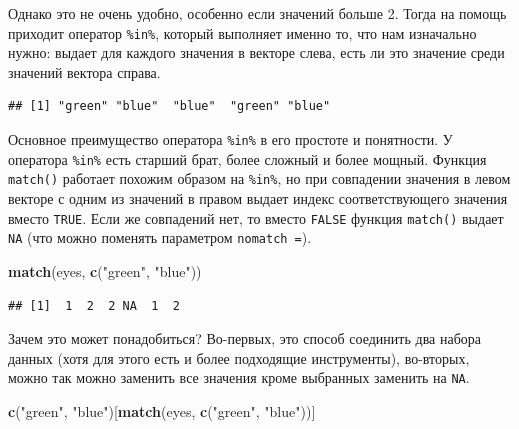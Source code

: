 \documentclass[]{book}
\newenvironment{Shaded}{\begin{snugshade}}{\end{snugshade}}
\newcommand{\KeywordTok}[1]{\textcolor[rgb]{0.13,0.29,0.53}{\textbf{#1}}}
\newcommand{\StringTok}[1]{\textcolor[rgb]{0.31,0.60,0.02}{#1}}
\newcommand{\OperatorTok}[1]{\textcolor[rgb]{0.81,0.36,0.00}{\textbf{#1}}}
\newcommand{\NormalTok}[1]{#1}
\begin{document}
Однако это не очень удобно, особенно если значений больше 2. Тогда на
помощь приходит оператор \texttt{\%in\%}, который выполняет именно то,
что нам изначально нужно: выдает для каждого значения в векторе слева,
есть ли это значение среди значений вектора справа.

\begin{Shaded}
\end{Shaded}

\begin{verbatim}
## [1] "green" "blue"  "blue"  "green" "blue"
\end{verbatim}

Основное преимущество оператора \texttt{\%in\%} в его простоте и
понятности. У оператора \texttt{\%in\%} есть старший брат, более сложный
и более мощный. Функция \texttt{match()} работает похожим образом на
\texttt{\%in\%}, но при совпадении значения в левом векторе с одним из
значений в правом выдает индекс соответствующего значения вместо
\texttt{TRUE}. Если же совпадений нет, то вместо \texttt{FALSE} функция
\texttt{match()} выдает \texttt{NA} (что можно поменять параметром
\texttt{nomatch\ =}).

\begin{Shaded}
\begin{Highlighting}[]
\KeywordTok{match}\NormalTok{(eyes, }\KeywordTok{c}\NormalTok{(}\StringTok{"green"}\NormalTok{, }\StringTok{"blue"}\NormalTok{))}
\end{Highlighting}
\end{Shaded}

\begin{verbatim}
## [1]  1  2  2 NA  1  2
\end{verbatim}

Зачем это может понадобиться? Во-первых, это способ соединить два набора
данных (хотя для этого есть и более подходящие инструменты), во-вторых,
можно так можно заменить все значения кроме выбранных заменить на
\texttt{NA}.

\begin{Shaded}
\begin{Highlighting}[]
\KeywordTok{c}\NormalTok{(}\StringTok{"green"}\NormalTok{, }\StringTok{"blue"}\NormalTok{)[}\KeywordTok{match}\NormalTok{(eyes, }\KeywordTok{c}\NormalTok{(}\StringTok{"green"}\NormalTok{, }\StringTok{"blue"}\NormalTok{))]}
\end{Highlighting}
\end{Shaded}
\end{document}
